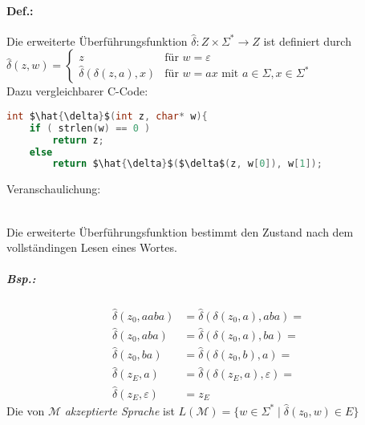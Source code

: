 \paragraph{Def.:} Die erweiterte Überführungsfunktion $\hat{\delta}:Z\times \Sigma^*\rightarrow Z$ ist definiert durch\\
$\hat{\delta}(z,w)=\begin{cases}
z & \text{für }w = \varepsilon\\
\hat{\delta}(\delta(z,a),x) & \text{für }w=ax \text{ mit } a\in \Sigma ,x \in \Sigma^*
\end{cases}$\\
Dazu vergleichbarer C-Code:
\begin{lstlisting}[language=C]
int $\hat{\delta}$(int z, char* w){
	if ( strlen(w) == 0 )
		return z;
	else
		return $\hat{\delta}$($\delta$(z, w[0]), w[1]);
\end{lstlisting}
Veranschaulichung:\\
\\
Die erweiterte Überführungsfunktion bestimmt den Zustand nach dem vollständingen Lesen eines Wortes.

\subparagraph{Bsp.:} \parskp
{}
\begin{align*}
\hat{\delta}(z_0, aaba) &= \hat{\delta}(\delta(z_0,a),aba)=\\
\hat{\delta}(z_0, aba) &= \hat{\delta}(\delta(z_0,a),ba)=\\
\hat{\delta}(z_0, ba) &= \hat{\delta}(\delta(z_0,b),a)=\\
\hat{\delta}(z_E, a) &= \hat{\delta}(\delta(z_E,a), \varepsilon)=\\
\hat{\delta}(z_E, \varepsilon) &= z_E
\end{align*}
Die von $\mathcal{M}$ \emph{akzeptierte Sprache} ist $L(\mathcal{M})=\{w\in \Sigma^* \;|\; \hat{\delta}(z_0, w) \in E\}$

